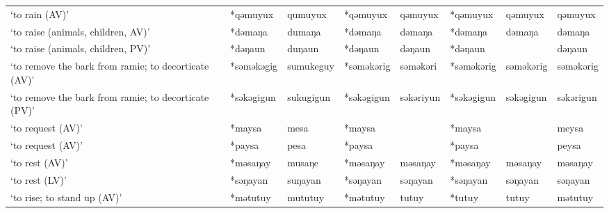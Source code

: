 \begin{landscape}
\begin{longtable}[c]{@{}p{3cm}<{\raggedright}p{2.75cm}<{\raggedright}p{2.75cm}<{\raggedright}p{2.75cm}<{\raggedright}p{2.75cm}<{\raggedright}p{2.75cm}<{\raggedright}p{2.75cm}<{\raggedright}p{2.75cm}<{\raggedright}@{}}
`to rain (AV)'                                       & *qəmuyux           & qumuyux                        & *qəmuyux           & qəmuyux                    & *qəmuyux         & qəmuyux                  & qəmuyux                           \\
`to raise (animals, children, AV)'                   & *dəmaŋa            & dumaŋa                         & *dəmaŋa            & dəmaŋa                     & *dəmaŋa          & dəmaŋa                   & dəmaŋa                            \\
`to raise (animals, children, PV)'                   & *dəŋaun            & duŋaun                         & *dəŋaun            & dəŋaun                     & *dəŋaun          &                          & dəŋaun                            \\
`to remove the bark from ramie; to decorticate (AV)' & *səməkəgig         & sumukeguy                      & *səməkərig         & səməkəri                   & *səməkərig       & səməkərig                & səməkərig                         \\
`to remove the bark from ramie; to decorticate (PV)' & *səkəgigun         & sukugigun                      & *səkəgigun         & səkəriyun                  & *səkəgigun       & səkəgigun                & səkərigun                         \\
`to request (AV)'                                    & *maysa             & mesa                           & *maysa             &                            & *maysa           &                          & meysa                             \\
`to request (AV)'                                    & *paysa             & pesa                           & *paysa             &                            & *paysa           &                          & peysa                             \\
`to rest (AV)'                                       & *məsaŋay           & musaŋe                         & *məsaŋay           & məsaŋay                    & *məsaŋay         & məsaŋay                  & məsaŋay                           \\
`to rest (LV)'                                       & *səŋayan           & suŋayan                        & *səŋayan           & səŋayan                    & *səŋayan         & səŋayan                  & səŋayan                           \\
`to rise; to stand up (AV)'                          & *mətutuy           & mututuy                        & *mətutuy           & tutuy                      & *tutuy           & tutuy                    & mətutuy                           \\

\end{longtable}
\end{landscape}
